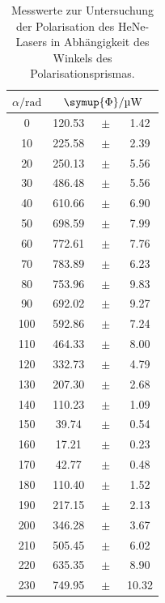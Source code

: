 \FloatBarrier
\begin{table}[h]
    \centering
    \caption{Messwerte zur Untersuchung der Polarisation des HeNe-Lasers in Abhängigkeit des Winkels des Polarisationsprismas.}
    \label{tab:atab4}
    \begin{tabular}{S[table-format=3.0]  S[table-format=3.2] @{}c @{}S[table-format=2.3]}
        \toprule
        {$\alpha/\mathrm{rad}$} & \\
        \midrule
        0    & 120.53 &{$\;\pm\;$}& 1.42 \\
        10   & 225.58 &{$\;\pm\;$}& 2.39 \\
        20   & 250.13 &{$\;\pm\;$}& 5.56 \\
        30   & 486.48 &{$\;\pm\;$}& 5.56 \\
        40   & 610.66 &{$\;\pm\;$}& 6.90 \\
        50   & 698.59 &{$\;\pm\;$}& 7.99 \\
        60   & 772.61 &{$\;\pm\;$}& 7.76 \\
        70   & 783.89 &{$\;\pm\;$}& 6.23 \\
        80   & 753.96 &{$\;\pm\;$}& 9.83 \\
        90   & 692.02 &{$\;\pm\;$}& 9.27 \\
        100  & 592.86 &{$\;\pm\;$}& 7.24 \\
        110  & 464.33 &{$\;\pm\;$}& 8.00 \\
        120  & 332.73 &{$\;\pm\;$}& 4.79 \\
        130  & 207.30 &{$\;\pm\;$}& 2.68 \\
        140  & 110.23 &{$\;\pm\;$}& 1.09 \\
        150  & 39.74  &{$\;\pm\;$}& 0.54 \\
        160  & 17.21  &{$\;\pm\;$}& 0.23 \\
        170  & 42.77  &{$\;\pm\;$}& 0.48 \\
        180  & 110.40 &{$\;\pm\;$}& 1.52 \\
        190  & 217.15 &{$\;\pm\;$}& 2.13 \\
        200  & 346.28 &{$\;\pm\;$}& 3.67 \\
        210  & 505.45 &{$\;\pm\;$}& 6.02 \\
        220  & 635.35 &{$\;\pm\;$}& 8.90 \\
        230  & 749.95 &{$\;\pm\;$}& 10.32 \\

\end{tabular}
\end{table}
